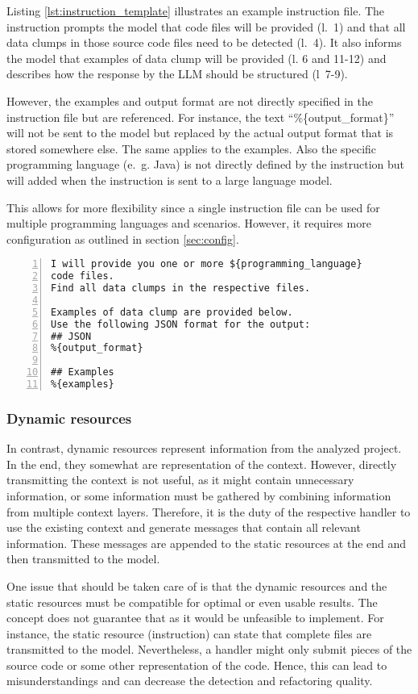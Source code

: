 Listing \ref{lst:instruction_template} illustrates an example instruction file.  The instruction prompts the model that code files will be provided (l.~1) and that all data clumps in those source code files need to be detected (l.~4). It also informs the model that examples of data clump will be provided (l. 6 and 11-12) and describes how the response by the \ac{LLM} should be structured (l~7-9). 

However, the examples and output format are not directly specified in the instruction file but are referenced. For instance, the text \enquote{\%\{output\_format\}} will not be sent to the model but replaced by the actual output format that is stored somewhere else. The same applies to the examples. Also the specific programming language (e.~g. Java) is not directly defined by the instruction but will added when the instruction is sent to a large language model.

This allows for more flexibility since a single instruction file can be used for multiple programming languages and scenarios. However, it requires more configuration as outlined in section \ref{sec:config}.
\begin{lstlisting}[caption={Instruction file example}, label={lst:instruction_template}, captionpos=b, numbers=left, ]
I will provide you one or more ${programming_language}
code files.
Find all data clumps in the respective files.

Examples of data clump are provided below.
Use the following JSON format for the output:
## JSON
%{output_format}

## Examples
%{examples}
\end{lstlisting}


\hfill
\subsubsection{Dynamic resources}

In contrast, dynamic resources represent information from the analyzed project. In the end, they somewhat are representation of the context. However, directly transmitting the context is not useful, as it might contain unnecessary information, or some information must be gathered by combining information from multiple context layers. Therefore, it is the duty of the respective handler to use the existing context and generate messages that contain all relevant information. These messages are appended to the static resources at the end and then transmitted to the model. 

One issue that should be taken care of is that the dynamic resources and the static resources must be compatible for optimal or even usable results. The concept does not guarantee that as it would be unfeasible to implement. For instance, the static resource (instruction) can state that complete files are transmitted to the model. Nevertheless, a handler might only submit pieces of the source code or some other representation of the code. Hence,  this can lead to misunderstandings and can decrease the detection and refactoring quality. 
